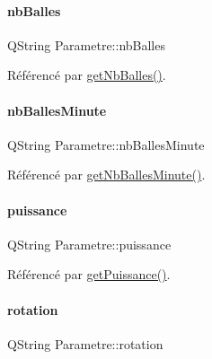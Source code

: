 \paragraph{\texorpdfstring{nb\+Balles}{nbBalles}}
{\footnotesize\ttfamily Q\+String Parametre\+::nb\+Balles\hspace{0.3cm}{\ttfamily [read]}}



Référencé par \hyperlink{class_parametre_a47d9b5efc103fa6a4a69754136ffa641}{get\+Nb\+Balles()}.

\mbox{\label{class_parametre_a6d2be86cf41aef4e099b0a7421c735c8}} 
\paragraph{\texorpdfstring{nb\+Balles\+Minute}{nbBallesMinute}}
{\footnotesize\ttfamily Q\+String Parametre\+::nb\+Balles\+Minute\hspace{0.3cm}{\ttfamily [read]}}



Référencé par \hyperlink{class_parametre_a5b365053ce5325ec951c837463826774}{get\+Nb\+Balles\+Minute()}.

\mbox{\label{class_parametre_aace4f0265742e479043b3e2afa33771e}} 
\paragraph{\texorpdfstring{puissance}{puissance}}
{\footnotesize\ttfamily Q\+String Parametre\+::puissance\hspace{0.3cm}{\ttfamily [read]}}



Référencé par \hyperlink{class_parametre_a11d2ada45a77abb2e99f9cde1c2d352d}{get\+Puissance()}.

\mbox{\label{class_parametre_ab8cd796bb232cba0abe0aab5b02ae52b}} 
\paragraph{\texorpdfstring{rotation}{rotation}}
{\footnotesize\ttfamily Q\+String Parametre\+::rotation\hspace{0.3cm}{\ttfamily [read]}}



